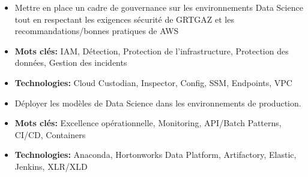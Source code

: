 \documentclass[10pt,a4paper,ragged2e]{altacv}
\begin{document}
\begin{paracol}{2}

\divider


\divider



\begin{itemize}
\item Mettre en place un cadre de gouvernance sur les environnements Data Science tout en respectant les exigences sécurité de GRTGAZ et les recommandations/bonnes pratiques de AWS
\item \textbf{Mots clés:} IAM, Détection, Protection de l'infrastructure, Protection des données, Gestion des incidents
\item \textbf{Technologies:} Cloud Custodian, Inspector, Config, SSM, Endpoints, VPC
\end{itemize}

\divider

\begin{itemize}
\item Déployer les modèles de Data Science dans les environnements de production.
\item \textbf{Mots clés:} Excellence opérationnelle, Monitoring, API/Batch Patterns, CI/CD, Containers
\item \textbf{Technologies:} Anaconda, Hortonworks Data Platform, Artifactory, Elastic, Jenkins, XLR/XLD
\end{itemize}


\end{paracol}
\end{document}
